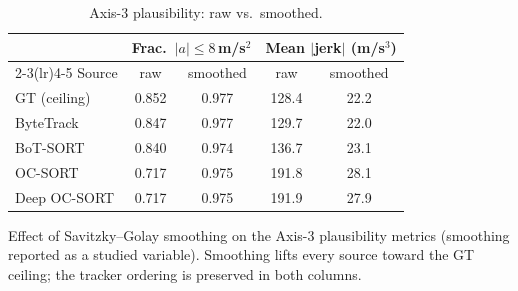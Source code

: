 \begin{table}[ht]
  \centering
  \caption{Axis-3 plausibility: raw vs.\ smoothed.}
  \label{tab:smoothing}
  \begin{tabular}{lcccc}
    \toprule
    & \multicolumn{2}{c}{Frac.\ $|a|\le8$\,m/s$^2$} & \multicolumn{2}{c}{Mean $|$jerk$|$ (m/s$^3$)} \\
    \cmidrule(lr){2-3}\cmidrule(lr){4-5}
    Source & raw & smoothed & raw & smoothed \\
    \midrule
    GT (ceiling) & 0.852 & 0.977 & 128.4 & 22.2 \\
    ByteTrack & 0.847 & 0.977 & 129.7 & 22.0 \\
    BoT-SORT & 0.840 & 0.974 & 136.7 & 23.1 \\
    OC-SORT & 0.717 & 0.975 & 191.8 & 28.1 \\
    Deep OC-SORT & 0.717 & 0.975 & 191.9 & 27.9 \\
    \bottomrule
  \end{tabular}
  \par\smallskip
  \footnotesize Effect of Savitzky--Golay smoothing on the Axis-3 plausibility metrics (smoothing reported as a studied variable). Smoothing lifts every source toward the GT ceiling; the tracker ordering is preserved in both columns.
\end{table}
